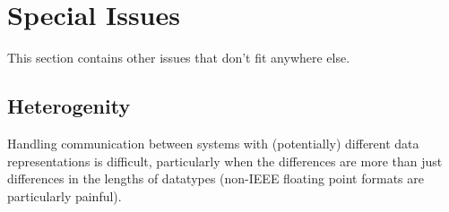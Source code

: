 \documentclass{article}
\begin{document}




\section{Special Issues}
\label{sec:special-issues}

This section contains other issues that don't fit anywhere else.


\subsection{Heterogenity}
\label{sec:hetero-issues}

Handling communication between systems with (potentially) different data
representations is difficult, particularly when the differences are more than
just differences in the lengths of datatypes (non-IEEE floating point formats
are particularly painful).


\end{document}
